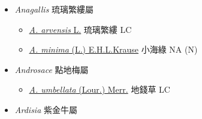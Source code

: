
  \begin{itemize}
 \item[] \textit{Anagallis} 琉璃繁縷屬
                                
  \begin{itemize}
        \item[] \href{http://www.theplantlist.org/tpl1.1/search?q=Anagallis+arvensis}{\textit{A. arvensis} L.}   琉璃繁縷   LC
        \item[] \href{http://www.theplantlist.org/tpl1.1/search?q=Anagallis+minima}{\textit{A. minima} (L.) E.H.L.Krause}   小海綠   NA (N)
  \end{itemize}
 \item[] \textit{Androsace} 點地梅屬
                                
  \begin{itemize}
        \item[] \href{http://www.theplantlist.org/tpl1.1/search?q=Androsace+umbellata}{\textit{A. umbellata} (Lour.) Merr.}   地錢草   LC
  \end{itemize}
 \item[] \textit{Ardisia} 紫金牛屬
                                

\end{itemize}
